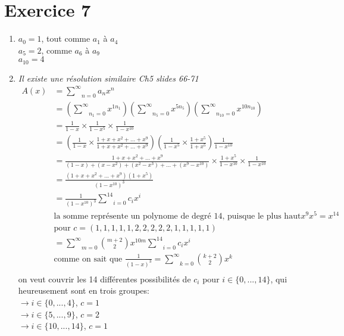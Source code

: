 \documentclass[fontsize=10pt]{article}
\begin{document}
\section*{Exercice 7}
\begin{enumerate}
\item
$a_0 = 1$, tout comme $a_1$ à $a_4$\\
$a_5 = 2$, comme $a_6$ à $a_9$\\
$a_{10} = 4$
\item
\textit{Il existe une résolution similaire Ch5 slides 66-71}
\begin{align*}
A(x) &= \underset{n=0}{\overset{\infty}{\sum}} a_n x^n\\
&= \left(\underset{n_1=0}{\overset{\infty}{\sum}}x^{1n_1}\right)\left(\underset{n_5=0}{\overset{\infty}{\sum}}x^{5n_5}\right)\left(\underset{n_{10}=0}{\overset{\infty}{\sum}}x^{10n_{10}}\right)\\
&= \frac{1}{1-x} \times \frac{1}{1-x^5} \times \frac{1}{1-x^10}\\
&= \left(\frac{1}{1-x} \times \frac{1+x+x^2+...+x^9}{1+x+x^2+...+x^9}\right)\left(\frac{1}{1-x^5} \times \frac{1+x^5}{1+x^5}\right)\frac{1}{1-x^{10}}\\
&= \frac{1+x+x^2+...+x^9}{(1-x)+(x-x^2)+(x^2-x^3)+...+(x^9-x^{10})} \times \frac{1+x^5}{1-x^{10}} \times \frac{1}{1-x^{10}}\\
&= \frac{(1+x+x^2+...+x^9)(1+x^5)}{(1-x^{10})^3}\\
&= \frac{1}{(1-x^{10})^3}\underset{i=0}{\overset{14}{\sum}} c_i x^i\\
&\text{la somme représente un polynome de degré 14, puisque le plus haut degré est } x^9x^5 = x^{14}\\
&\text{pour } c = (1,1,1,1,1,2,2,2,2,2,1,1,1,1,1)\\
&= \underset{m=0}{\overset{\infty}{\sum}} {m+2 \choose 2} x^{10m} \underset{i=0}{\overset{14}{\sum}} c_i x^i\\
&\text{comme on sait que } \frac{1}{(1-x)^3} = \underset{k=0}{\overset{\infty}{\sum}} {k+2 \choose 2} x^k\\
\end{align*}
on veut couvrir les 14 différentes possibilités de $c_i$ pour $i \in \{0,...,14\}$, qui heureusement sont en trois groupes:\\
$\rightarrow i \in \{0,...,4\}$, $c=1$\\
$\rightarrow i \in \{5,...,9\}$, $c=2$\\
$\rightarrow i \in \{10,...,14\}$, $c=1$\\

\end{enumerate}
\end{document}
